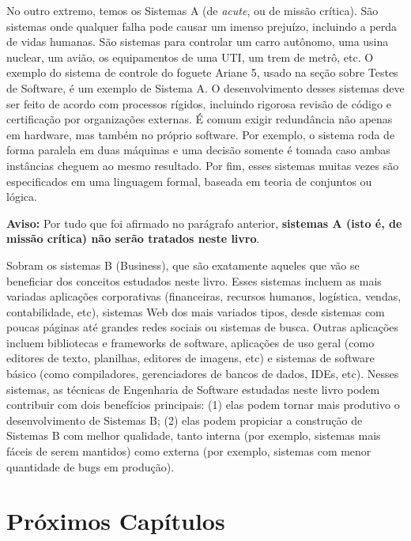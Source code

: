 \documentclass[
  11pt,
  twoside]{book}
\newenvironment{aviso}{\centering \vspace{1.5ex} \begin{tcolorbox}[breakable, colback=backcolor, width=4.9in]}{\end{tcolorbox} \vspace{1.5ex}}
\begin{document}
 No outro extremo, temos os Sistemas A
(de \emph{acute}, ou de missão crítica). São sistemas onde qualquer
falha pode causar um imenso prejuízo, incluindo a perda de vidas
humanas. São sistemas para controlar um carro autônomo, uma usina
nuclear, um avião, os equipamentos de uma UTI, um trem de metrô, etc. O
exemplo do sistema de controle do foguete Ariane 5, usado na seção sobre
Testes de Software, é um exemplo de Sistema A. O desenvolvimento desses
sistemas deve ser feito de acordo com processos rígidos, incluindo
rigorosa revisão de código e certificação por organizações externas. É
comum exigir redundância não apenas em hardware, mas também no próprio
software. Por exemplo, o sistema roda de forma paralela em duas máquinas
e uma decisão somente é tomada caso ambas instâncias cheguem ao mesmo
resultado. Por fim, esses sistemas muitas vezes são especificados em uma
linguagem formal, baseada em teoria de conjuntos ou lógica.

\begin{aviso}

\textbf{Aviso:} Por tudo que foi afirmado no parágrafo anterior,
\textbf{sistemas A (isto é, de missão crítica) não serão tratados neste
livro}.

\end{aviso}

Sobram os sistemas B (Business), que são exatamente aqueles que vão se
beneficiar dos conceitos estudados neste livro. Esses sistemas incluem
as mais variadas aplicações corporativas (financeiras, recursos humanos,
logística, vendas, contabilidade, etc), sistemas Web dos mais variados
tipos, desde sistemas com poucas páginas até grandes redes sociais ou
sistemas de busca. Outras aplicações incluem bibliotecas e frameworks de
software, aplicações de uso geral (como editores de texto, planilhas,
editores de imagens, etc) e sistemas de software básico (como
compiladores, gerenciadores de bancos de dados, IDEs, etc). Nesses
sistemas, as técnicas de Engenharia de Software estudadas neste livro
podem contribuir com dois benefícios principais: (1) elas podem tornar
mais produtivo o desenvolvimento de Sistemas B; (2) elas podem propiciar
a construção de Sistemas B com melhor qualidade, tanto interna (por
exemplo, sistemas mais fáceis de serem mantidos) como externa (por
exemplo, sistemas com menor quantidade de bugs em produção).

\hypertarget{pruxf3ximos-capuxedtulos}{%
\section{Próximos Capítulos}\label{pruxf3ximos-capuxedtulos}}
\end{document}
